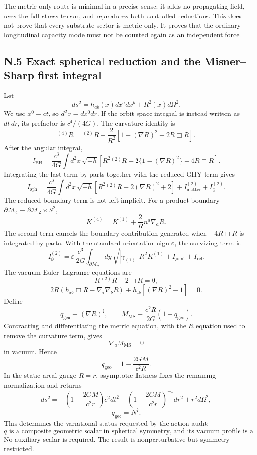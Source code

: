 \documentclass[11pt]{article}
\begin{document}
The metric-only route is minimal in a precise sense: it adds no propagating field, uses the full stress tensor, and reproduces both controlled reductions. This does not prove that every substrate sector is metric-only. It proves that the ordinary longitudinal capacity mode must not be counted again as an independent force.

\subsection*{N.5 Exact spherical reduction and the Misner--Sharp first integral}

Let
\[
ds^2=h_{ab}(x)dx^adx^b+R^2(x)d\Omega^2.
\]
We use $x^0=ct$, so $d^2x=dx^0dr$. If the orbit-space integral is instead written as $dt\,dr$, its prefactor is $c^4/(4G)$.
The curvature identity is
\[
{}^{(4)}R
=
{}^{(2)}R
+\frac{2}{R^2}
\left[1-(\nabla R)^2-2R\Box R\right].
\]
After the angular integral,
\[
I_{\mathrm{EH}}
=\frac{c^3}{4G}
\int d^2x\,\sqrt{-h}
\left[
R^2{}^{(2)}R+2\{1-(\nabla R)^2\}-4R\Box R
\right].
\]
Integrating the last term by parts together with the reduced GHY term gives
\[
\boxed{
I_{\mathrm{sph}}
=\frac{c^3}{4G}
\int d^2x\,\sqrt{-h}
\left[
R^2{}^{(2)}R+2(\nabla R)^2+2
\right]
+I_{\mathrm{matter}}^{(2)}+I_\partial^{(2)}.
}
\]
The reduced boundary term is not left implicit. For a product boundary $\partial\mathcal M_4=\partial\mathcal M_2\times S^2$,
\[
K^{(4)}=K^{(1)}+\frac{2}{R}n^a\nabla_aR.
\]
The second term cancels the boundary contribution generated when $-4R\Box R$ is integrated by parts. With the standard orientation sign $\varepsilon$, the surviving term is
\[
I_\partial^{(2)}
=\varepsilon\,\frac{c^3}{2G}
\int_{\partial\mathcal M_2}dy\,
\sqrt{|\gamma_{(1)}|}\,R^2K^{(1)}
+I_{\mathrm{joint}}+I_{\mathrm{ref}}.
\]
The vacuum Euler--Lagrange equations are
\[
R\,{}^{(2)}R-2\Box R=0,
\]
\[
2R\left(h_{ab}\Box R-\nabla_a\nabla_bR\right)
+h_{ab}\left[(\nabla R)^2-1\right]=0.
\]
Define
\[
q_{\mathrm{geo}}\equiv(\nabla R)^2,
\qquad
M_{\mathrm{MS}}
\equiv\frac{c^2R}{2G}(1-q_{\mathrm{geo}}).
\]
Contracting and differentiating the metric equation, with the $R$ equation used to remove the curvature term, gives
\[
\nabla_aM_{\mathrm{MS}}=0
\]
in vacuum. Hence
\[
q_{\mathrm{geo}}
=1-\frac{2GM}{c^2R}.
\]
In the static areal gauge $R=r$, asymptotic flatness fixes the remaining normalization and returns
\[
ds^2
=-\left(1-\frac{2GM}{c^2r}\right)c^2dt^2
+\left(1-\frac{2GM}{c^2r}\right)^{-1}dr^2+r^2d\Omega^2,
\]
\[
q_{\mathrm{geo}}=N^2.
\]
This determines the variational status requested by the action audit:
\[
\boxed{
\text{$q$ is a composite geometric scalar in spherical symmetry, and its vacuum profile is a first integral.}
}
\]
No auxiliary scalar is required. The result is nonperturbative but symmetry restricted.
\end{document}
